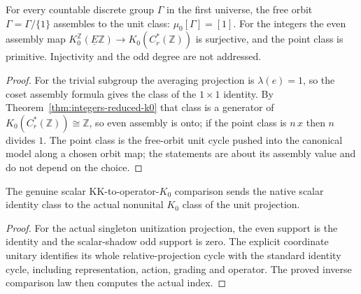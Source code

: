 \begin{proposition}\label{prop:integer-even-assembly}
\leanok
For every countable discrete group $\Gamma$ in the first universe, the free
orbit $\Gamma=\Gamma/\{1\}$ assembles to the unit class:
$\mu_0[\Gamma]=[1]$. For the integers the even assembly map
$K_0^{\mathbb Z}(\underline E\mathbb Z)\to K_0(C^*_r(\mathbb Z))$ is
surjective, and the point class is primitive. Injectivity and the odd degree
are not addressed.
\end{proposition}
\begin{proof}
\leanok
For the trivial subgroup the averaging projection is $\lambda(e)=1$, so the
coset assembly formula gives the class of the $1\times1$ identity. By
Theorem~\ref{thm:integers-reduced-k0} that class is a generator of
$K_0(C^*_r(\mathbb Z))\cong\mathbb Z$, so even assembly is onto; if the point
class is $n\,x$ then $n$ divides $1$. The point class is the free-orbit unit
cycle pushed into the canonical model along a chosen orbit map; the statements
are about its assembly value and do not depend on the choice.
\end{proof}


\begin{proposition}\label{prop:scalar-unit-projection-identity}
\leanok
The genuine scalar KK-to-operator-$K_0$ comparison sends the native scalar
identity class to the actual nonunital $K_0$ class of the unit projection.
\end{proposition}
\begin{proof}
\leanok
For the actual singleton unitization projection, the even support is the
identity and the scalar-shadow odd support is zero. The explicit coordinate
unitary identifies its whole relative-projection cycle with the standard
identity cycle, including representation, action, grading and operator.
The proved inverse comparison law then computes the actual index.
\end{proof}

